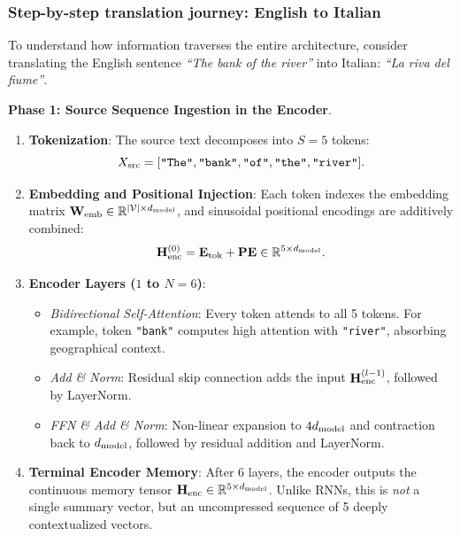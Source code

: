 \documentclass[../../main.tex]{subfiles}
\begin{document}
\subsubsection{Step-by-step translation journey: English to Italian}
To understand how information traverses the entire architecture, consider translating the English sentence \emph{``The bank of the river''} into Italian: \emph{``La riva del fiume''}.

\noindent\textbf{Phase 1: Source Sequence Ingestion in the Encoder}.\newline
\begin{enumerate}
    \item \textbf{Tokenization}: The source text decomposes into $S = 5$ tokens:
    \begin{equation}
    X_{\text{src}} = [\text{\texttt{"The"}}, \text{\texttt{"bank"}}, \text{\texttt{"of"}}, \text{\texttt{"the"}}, \text{\texttt{"river"}}].
    \end{equation}
    \item \textbf{Embedding and Positional Injection}: Each token indexes the embedding matrix $\mathbf{W}_{\text{emb}} \in \mathbb{R}^{|\mathcal{V}| \times d_{\text{model}}}$, and sinusoidal positional encodings are additively combined:
    \begin{equation}
    \mathbf{H}_{\text{enc}}^{(0)} = \mathbf{E}_{\text{tok}} + \mathbf{PE} \in \mathbb{R}^{5 \times d_{\text{model}}}.
    \end{equation}
    \item \textbf{Encoder Layers ($1$ to $N = 6$)}:
    \begin{itemize}
        \item \emph{Bidirectional Self-Attention}: Every token attends to all 5 tokens. For example, token \texttt{"bank"} computes high attention with \texttt{"river"}, absorbing geographical context.
        \item \emph{Add \& Norm}: Residual skip connection adds the input $\mathbf{H}_{\text{enc}}^{(l-1)}$, followed by LayerNorm.
        \item \emph{FFN \& Add \& Norm}: Non-linear expansion to $4d_{\text{model}}$ and contraction back to $d_{\text{model}}$, followed by residual addition and LayerNorm.
    \end{itemize}
    \item \textbf{Terminal Encoder Memory}: After 6 layers, the encoder outputs the continuous memory tensor $\mathbf{H}_{\text{enc}} \in \mathbb{R}^{5 \times d_{\text{model}}}$. Unlike RNNs, this is \emph{not} a single summary vector, but an uncompressed sequence of 5 deeply contextualized vectors.
\end{enumerate}
\end{document}
